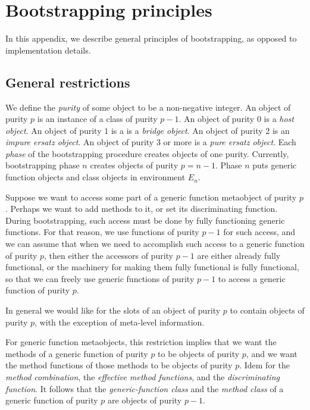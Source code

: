 \chapter{Bootstrapping principles}

In this appendix, we describe general principles of bootstrapping, as
opposed to implementation details.

\section{General restrictions}

We define the \emph{purity} of some object to be a non-negative
integer.  An object of purity $p$ is an instance of a class of purity
$p-1$.  An object of purity $0$ is a \emph{host object}.  An object of
purity $1$ is a is a \emph{bridge object}.  An object of purity $2$ is
an \emph{impure ersatz object}.  An object of purity $3$ or more is a
\emph{pure ersatz object}.  Each \emph{phase} of the bootstrapping
procedure creates objects of one purity.  Currently, bootstrapping
phase $n$ creates objects of purity $p=n-1$.  Phase $n$ puts generic
function objects and class objects in environment $E_n$.

Suppose we want to access some part of a generic function metaobject
of purity $p$.  Perhaps we want to add methods to it, or set its
discriminating function.  During bootstrapping, such access must be
done by fully functioning generic functions.  For that reason, we use
functions of purity $p-1$ for such access, and we can assume that when
we need to accomplish such access to a generic function of purity $p$,
then either the accessors of purity $p-1$ are either already fully
functional, or the machinery for making them fully functional is fully
functional, so that we can freely use generic functions of purity
$p-1$ to access a generic function of purity $p$.

In general we would like for the slots of an object of purity $p$ to
contain objects of purity $p$, with the exception of meta-level
information.

For generic function metaobjects, this restriction implies that we
want the methods of a generic function of purity $p$ to be objects of
purity $p$, and we want the method functions of those methods to be
objects of purity $p$.  Idem for the \emph{method combination}, the
\emph{effective method functions}, and the \emph{discriminating
  function}.  It follows that the \emph{generic-function class} and
the \emph{method class} of a generic function of purity $p$ are
objects of purity $p-1$.

